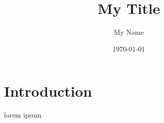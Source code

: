 \documentclass[10pt]{article}
\title{My Title}
\author{My Name}
\date{\today}
\begin{document}
    \maketitle
    \section{Introduction}
    lorem ipsum
\end{document}
